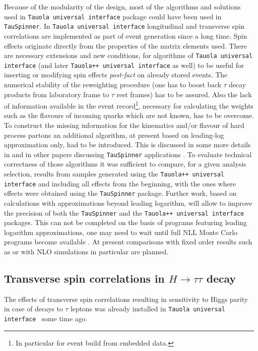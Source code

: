 \documentclass[12pt]{article}
\begin{document}
Because of the modularity of the design, most of the algorithms and solutions used in {\tt Tauola universal interface} package \cite{Golonka:2003xt}  
could have been used in {\tt TauSpinner}.  
In {\tt Tauola universal interface} 
longitudinal and transverse spin correlations are implemented as part of event generation since a long time. 
Spin effects  originate directly from the properties of  the matrix elements used. 
There are necessary extensions and new conditions, for algorithms of {\tt Tauola universal interface}
(and later {\tt Tauola++ universal interface}  \cite{Davidson:2010rw} as well)
to be useful for  inserting or modifying spin effects {\it post-fact} on already stored events.
 The numerical 
stability of the reweighting procedure (one has to boost back $\tau$ decay products from laboratory frame to $\tau$ rest frames)
has to be assured.  Also
the lack of information  available in the event record\footnote{In particular for event build from embedded data.},
necessary for calculating  the weights such as the flavours of incoming quarks which are not known, has to be overcome. 
To construct the missing information for the kinematics and/or flavour of hard process partons
an additional  algorithm, at present based on leading-log approximation only,  had to be introduced.
This is discussed in some more details in \cite{TauSpinner2014} and in other papers discussing {\tt TauSpinner} applications 
\cite{Czyczula:2012ny,Banerjee:2012ez}. 
To evaluate technical correctness of those algorithms it was sufficient to compare, for a given analysis selection,  
results from samples generated 
using the {\tt Tauola++ universal interface} and including all effects from the beginning, with the ones where effects were
obtained using the {\tt TauSpinner} package. Further work,  based on calculations with  approximations beyond
leading logarithm, will  allow to improve the precision of both the {\tt TauSpinner} and the 
{\tt Tauola++ universal interface} packages. This can not be completed on the basis of programs featuring leading logarithm 
approximations, one may need to wait until full NLL Monte Carlo programs become available \cite{Jadach:2012vs}.
At present comparisons with fixed order results such as \cite{vanHameren:2008dy}  or with NLO 
simulations in particular \cite{Alioli:2008tz,Nason:2009ai} are planned.



\subsection{Transverse spin correlations in $H \to \tau \tau$ decay}
The effects of transverse spin correlations resulting in sensitivity to Higgs parity in case of 
decays to $\tau$ leptons was already installed in {\tt Tauola universal interface}~\cite{Golonka:2003xt} some time ago.
 
\end{document}
